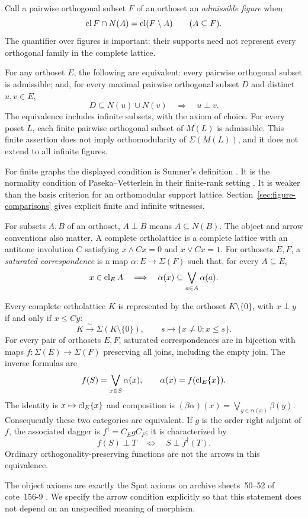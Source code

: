 Call a pairwise orthogonal subset $F$ of an orthoset an
\emph{admissible figure} when
\[
 \operatorname{cl} F\cap N(A)=\operatorname{cl}(F\setminus A)\qquad(A\subseteq F).
\]
The quantifier over figures is important: their supports need not
represent every orthogonal family in the complete lattice.

\begin{theorem}\label{thm:flags}
For any orthoset $E$, the following are equivalent: every pairwise
orthogonal subset is admissible; and, for every maximal pairwise
orthogonal subset $D$ and distinct $u,v\in E$,
\[
 D\subseteq N(u)\cup N(v)\quad\Longrightarrow\quad u\perp v.
\]
The equivalence includes infinite subsets, with the axiom of choice.
For every poset $L$, each finite pairwise orthogonal subset of $M(L)$
is admissible. This finite assertion does not imply orthomodularity
of $\Sigma(M(L))$, and it does not extend to all infinite figures.
\end{theorem}
For finite graphs the displayed condition is Sumner's definition
\cite[p.~492]{Sumner}. It is the normality condition of
Paseka--Vetterlein in their finite-rank setting
\cite[Definition~2.4 and Lemma~2.5, pp.~5--6]{PV}.
It is weaker than the basis criterion for an orthomodular support
lattice. Section~\ref{sec:figure-comparisons} gives explicit finite
and infinite witnesses.

For subsets $A,B$ of an orthoset, $A\perp B$ means $A\subseteq N(B)$.
The object and arrow conventions also matter. A complete
ortholattice is a complete lattice with an antitone involution $C$
satisfying $x\wedge Cx=0$ and $x\vee Cx=1$. For orthosets $E,F$,
a \emph{saturated correspondence} is a map
$\alpha:E\to\Sigma(F)$ such that, for every $A\subseteq E$,
\[
 x\in\operatorname{cl}_E A\quad\Longrightarrow\quad
 \alpha(x)\subseteq\bigvee_{a\in A}\alpha(a).
\]

\begin{theorem}\label{thm:correspondence}
Every complete ortholattice $K$ is represented by the orthoset
$K\setminus\{0\}$, with $x\perp y$ if and only if $x\le Cy$:
\[
 K\xrightarrow{\sim}\Sigma(K\setminus\{0\}),\qquad
 s\longmapsto\{x\ne0:x\le s\}.
\]
For every pair of orthosets $E,F$, saturated correspondences are
in bijection with maps $f:\Sigma(E)\to\Sigma(F)$ preserving all
joins, including the empty join. The inverse formulas are
\[
 f(S)=\bigvee_{x\in S}\alpha(x),\qquad
 \alpha(x)=f(\operatorname{cl}_E\{x\}).
\]
The identity is $x\mapsto\operatorname{cl}_E\{x\}$ and composition is
$(\beta\alpha)(x)=\bigvee_{y\in\alpha(x)}\beta(y)$.
Consequently these two categories are equivalent. If $g$ is the
order right adjoint of $f$, the associated dagger is
$f^\dagger=C_EgC_F$; it is characterized by
\[
 f(S)\perp T\quad\Longleftrightarrow\quad S\perp f^\dagger(T).
\]
Ordinary orthogonality-preserving functions are not the arrows in
this equivalence.
\end{theorem}
The object axioms are exactly the Spat axioms on archive
sheets~50--52 of cote~156-9 \cite{Groth}. We specify the arrow
condition explicitly so that this statement does not depend on an
unspecified meaning of morphism.
